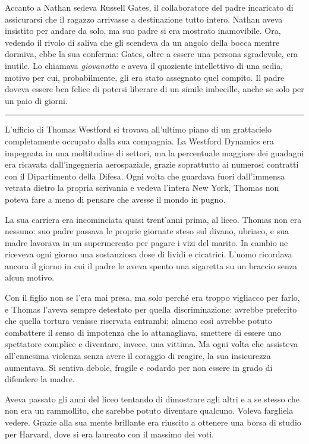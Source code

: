 \documentclass[a4paper,oneside,11pt]{memoir}
\begin{document}
Accanto a Nathan sedeva Russell Gates, il collaboratore del padre incaricato di
assicurarsi che il ragazzo arrivasse a destinazione tutto intero. Nathan aveva
insistito per andare da solo, ma suo padre si era mostrato inamovibile. Ora,
vedendo il rivolo di saliva che gli scendeva da un angolo della bocca mentre
dormiva, ebbe la sua conferma: Gates, oltre a essere una persona sgradevole, era
inutile. Lo chiamava \emph{giovanotto} e aveva il quoziente intellettivo di una
sedia, motivo per cui, probabilmente, gli era stato assegnato quel compito. Il
padre doveva essere ben felice di potersi liberare di un simile imbecille, anche
se solo per un paio di giorni.

\plainbreak{1}

L'ufficio di Thomas Westford si trovava all'ultimo piano di un grattacielo
completamente occupato dalla sua compagnia. La Westford Dynamics era impegnata
in una moltitudine di settori, ma la percentuale maggiore dei guadagni era
ricavata dall'ingegneria aerospaziale, grazie soprattutto ai numerosi contratti
con il Dipartimento della Difesa. Ogni volta che guardava fuori dall'immensa
vetrata dietro la propria scrivania e vedeva l'intera New York, Thomas non
poteva fare a meno di pensare che avesse il mondo in pugno.

La sua carriera era incominciata quasi trent'anni prima, al liceo. Thomas non
era nessuno: suo padre passava le proprie giornate steso sul divano, ubriaco, e
sua madre lavorava in un supermercato per pagare i vizi del marito. In cambio ne
riceveva ogni giorno una sostanziosa dose di lividi e cicatrici. L'uomo
ricordava ancora il giorno in cui il padre le aveva spento una sigaretta su un
braccio senza alcun motivo.

Con il figlio non se l'era mai presa, ma solo perché era troppo vigliacco per
farlo, e Thomas l'aveva sempre detestato per quella discriminazione: avrebbe
preferito che quella tortura venisse riservata entrambi; almeno così avrebbe
potuto combattere il senso di impotenza che lo attanagliava, smettere di essere
uno spettatore complice e diventare, invece, una vittima. Ma ogni volta che
assisteva all'ennesima violenza senza avere il coraggio di reagire, la sua
insicurezza aumentava. Si sentiva debole, fragile e codardo per non essere in
grado di difendere la madre.

Aveva passato gli anni del liceo tentando di dimostrare agli altri e a se stesso
che non era un rammollito, che sarebbe potuto diventare qualcuno. Voleva
fargliela vedere. Grazie alla sua mente brillante era riuscito a ottenere una
borsa di studio per Harvard, dove si era laureato con il massimo dei voti.
\end{document}

